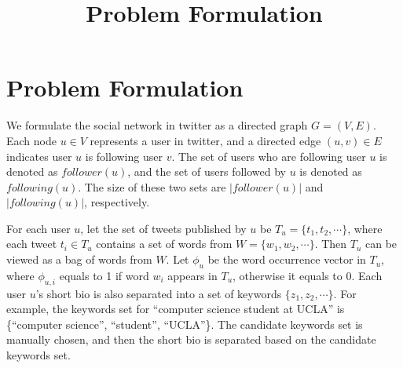 \documentclass{article}
\begin{document}
\title{Problem Formulation}
\maketitle \else \fi

\newcommand{\following}{\ensuremath{following}}
\newcommand{\follower}{\ensuremath{follower}}

\section{Problem Formulation}\label{sec:problem}
We formulate the social network in twitter as a directed graph $G = (V,E)$.
Each node $u \in V$ represents a user in twitter, and a directed edge $(u,v) \in E$ indicates
user $u$ is following user $v$. The set of users who are following user $u$ is denoted as $\follower(u)$, and the set of users followed by $u$ is denoted as $\following(u)$. The size of these two sets are $|\follower(u)|$ and $|\following(u)|$, respectively.

For each user $u$, let the set of tweets published by $u$ be $T_u = \{t_1, t_2, \cdots\}$, where each tweet $t_i \in T_u$ contains a set of words from $W = \{w_1, w_2, \cdots\}$. Then $T_u$ can be viewed as a bag of words from $W$. Let $\phi_u$ be the word occurrence vector in $T_u$, where $\phi_{u, i}$ equals to 1 if word $w_i$ appears in $T_u$, otherwise it equals to 0.
Each user $u$'s short bio is also separated into a set of keywords $\{z_1, z_2, \cdots\}$. For example, the keywords set for ``computer science student at UCLA'' is \{``computer science'', ``student'', ``UCLA''\}. The candidate keywords set is manually chosen, and then the short bio is separated based on the candidate keywords set.

\end{document}
